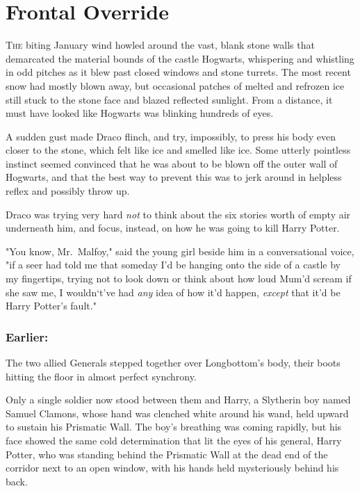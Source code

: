 \chapter{Frontal Override}

\lettrine{T}{he} biting 
January wind howled around the vast, blank stone walls that demarcated the 
material bounds of the castle Hogwarts, whispering and whistling in odd pitches 
as it blew past closed windows and stone turrets. The most recent snow had 
mostly blown away, but occasional patches of melted and refrozen ice still 
stuck to the stone face and blazed reflected sunlight. From a distance, it must 
have looked like Hogwarts was blinking hundreds of eyes.

A sudden gust made Draco flinch, and try, impossibly, to press his body even 
closer to the stone, which felt like ice and smelled like ice. Some utterly 
pointless instinct seemed convinced that he was about to be blown off the outer 
wall of Hogwarts, and that the best way to prevent this was to jerk around in 
helpless reflex and possibly throw up.

Draco was trying very hard \emph{not} to think about the six stories worth of 
empty air underneath him, and focus, instead, on how he was going to kill Harry 
Potter.

"You know, Mr.~Malfoy," said the young girl beside him in a conversational 
voice, "if a seer had told me that someday I'd be hanging onto the side of a 
castle by my fingertips, trying not to look down or think about how loud Mum'd 
scream if she saw me, I wouldn`t've had \emph{any} idea of how it'd happen, 
\emph{except} that it'd be Harry Potter's fault."
\sbreak
\vspace{-2\baselineskip}
\subsection{Earlier:}

The two allied Generals stepped together over Longbottom's body, their boots 
hitting the floor in almost perfect synchrony.

Only a single soldier now stood between them and Harry, a Slytherin boy named 
Samuel Clamons, whose hand was clenched white around his wand, held upward to 
sustain his Prismatic Wall. The boy's breathing was coming rapidly, but his 
face showed the same cold determination that lit the eyes of his general, Harry 
Potter, who was standing behind the Prismatic Wall at the dead end of the 
corridor next to an open window, with his hands held mysteriously behind his 
back.

